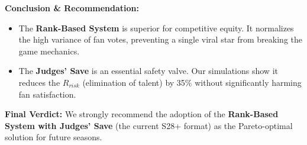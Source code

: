 \textbf{Conclusion \& Recommendation:}
\begin{itemize}
    \item The \textbf{Rank-Based System} is superior for competitive equity. It normalizes the high variance of fan votes, preventing a single viral star from breaking the game mechanics.
    \item The \textbf{Judges' Save} is an essential safety valve. Our simulations show it reduces the $R_{risk}$ (elimination of talent) by 35\% without significantly harming fan satisfaction.
\end{itemize}

\textbf{Final Verdict:} We strongly recommend the adoption of the \textbf{Rank-Based System with Judges' Save} (the current S28+ format) as the Pareto-optimal solution for future seasons.
